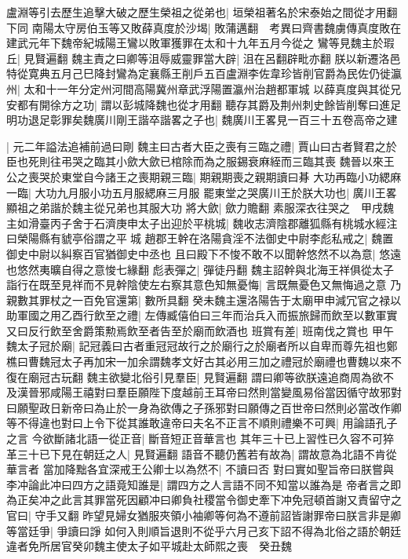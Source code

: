 盧淵等引去歷生追擊大破之歷生榮祖之從弟也|{
	垣榮祖著名於宋泰始之間從才用翻下同}
南陽太守房伯玉等又敗薛真度於沙堨|{
	敗蒲邁翻　考異曰齊書魏虜傳真度敗在建武元年下魏帝紀城陽王鸞以敗軍獲罪在太和十九年五月今從之}
鸞等見魏主於瑕丘|{
	見賢遍翻}
魏主責之曰卿等沮辱威靈罪當大辟|{
	沮在呂翻辟毗亦翻}
朕以新遷洛邑特從寛典五月己巳降封鸞為定襄縣王削戶五百盧淵李佐韋珍皆削官爵為民佐仍徙瀛州|{
	太和十一年分定州河間高陽冀州章武浮陽置瀛州治趙都軍城}
以薛真度與其從兄安都有開徐方之功|{
	謂以彭城降魏也從才用翻}
聽存其爵及荆州刺史餘皆削奪曰進足明功退足彰罪矣魏廣川剛王諧卒諧畧之子也|{
	魏廣川王畧見一百三十五卷高帝之建}


|{
	元二年謚法追補前過曰剛}
魏主曰古者大臣之喪有三臨之禮|{
	賈山曰古者賢君之於臣也死則往弔哭之臨其小歛大歛已棺除而為之服錫衰麻絰而三臨其喪}
魏晉以來王公之喪哭於東堂自今諸王之喪期親三臨|{
	期親期喪之親期讀曰朞}
大功再臨小功緦麻一臨|{
	大功九月服小功五月服緦麻三月服}
罷東堂之哭廣川王於朕大功也|{
	廣川王畧顯祖之弟諧於魏主從兄弟也其服大功}
將大歛|{
	歛力贍翻}
素服深衣往哭之　甲戌魏主如滑臺丙子舍于石濟庚申太子出迎於平桃城|{
	魏收志濟陰郡離狐縣有桃城水經注曰榮陽縣有䝞亭俗謂之平城}
趙郡王幹在洛陽貪淫不法御史中尉李彪私戒之|{
	魏置御史中尉以糾察百官猶御史中丞也}
且曰殿下不悛不敢不以聞幹悠然不以為意|{
	悠遠也悠然夷曠自得之意悛七緣翻}
彪表彈之|{
	彈徒丹翻}
魏主詔幹與北海王祥俱從太子詣行在既至見祥而不見幹陰使左右察其意色知無憂悔|{
	言既無憂色又無悔過之意}
乃親數其罪杖之一百免官還第|{
	數所具翻}
癸未魏主還洛陽告于太廟甲申減冗官之禄以助軍國之用乙酉行飲至之禮|{
	左傳臧僖伯曰三年而治兵入而振旅歸而飲至以數軍實又曰反行飲至舍爵策勲焉飲至者告至於廟而飲酒也}
班賞有差|{
	班南伐之賞也}
甲午魏太子冠於廟|{
	記冠義曰古者重冠冠故行之於廟行之於廟者所以自卑而尊先祖也鄭樵曰曹魏冠太子再加宋一加余謂魏孝文好古其必用三加之禮冠於廟禮也曹魏以來不復在廟冠古玩翻}
魏主欲變北俗引見羣臣|{
	見賢遍翻}
謂曰卿等欲朕遠追商周為欲不及漢晉邪咸陽王禧對曰羣臣願陛下度越前王耳帝曰然則當變風易俗當因循守故邪對曰願聖政日新帝曰為止於一身為欲傳之子孫邪對曰願傳之百世帝曰然則必當改作卿等不得違也對曰上令下從其誰敢違帝曰夫名不正言不順則禮樂不可興|{
	用論語孔子之言}
今欲斷諸北語一從正音|{
	斷音短正音華言也}
其年三十已上習性已久容不可猝革三十已下見在朝廷之人|{
	見賢遍翻}
語音不聽仍舊若有故為|{
	謂故意為北語不肯從華言者}
當加降黜各宜深戒王公卿士以為然不|{
	不讀曰否}
對曰實如聖旨帝曰朕嘗與李冲論此冲曰四方之語竟知誰是|{
	謂四方之人言語不同不知當以誰為是}
帝者言之即為正矣冲之此言其罪當死因顧冲曰卿負社稷當令御史牽下冲免冠頓首謝又責留守之官曰|{
	守手又翻}
昨望見婦女猶服夾領小袖卿等何為不遵前詔皆謝罪帝曰朕言非是卿等當廷爭|{
	爭讀曰諍}
如何入則順旨退則不從乎六月己亥下詔不得為北俗之語於朝廷違者免所居官癸卯魏主使太子如平城赴太師熙之喪　癸丑魏

